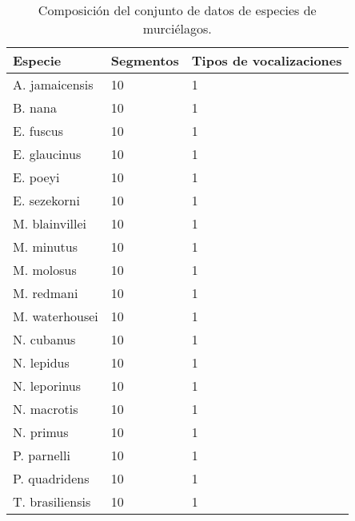 \begin{table}[h]
    \centering
    \begin{tabular}{lll}
        \hline
        Especie & Segmentos & Tipos de vocalizaciones   \\ \hline
        A. jamaicensis & 10 & 1                         \\
        B. nana & 10 & 1                                \\
        E. fuscus & 10 & 1                              \\
        E. glaucinus & 10 & 1                           \\
        E. poeyi & 10 & 1                               \\
        E. sezekorni & 10 & 1                           \\
        M. blainvillei & 10 & 1                         \\
        M. minutus & 10 & 1                             \\
        M. molosus & 10 & 1                             \\
        M. redmani & 10 & 1                             \\
        M. waterhousei & 10 & 1                         \\
        N. cubanus & 10 & 1                             \\
        N. lepidus & 10 & 1                             \\
        N. leporinus & 10 & 1                           \\
        N. macrotis & 10 & 1                            \\
        N. primus & 10 & 1                              \\
        P. parnelli & 10 & 1                            \\
        P. quadridens & 10 & 1                          \\
        T. brasiliensis & 10 & 1
    \end{tabular}
    \caption{Composición del conjunto de datos de especies de murciélagos.}
    \label{table:bats-dataset}
\end{table}


